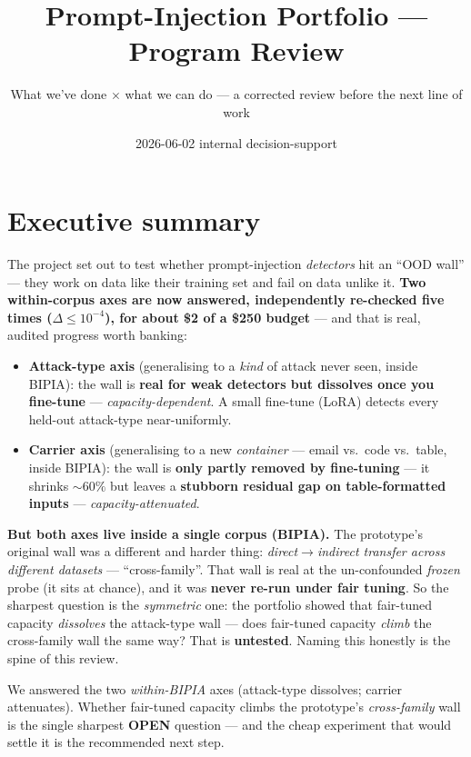 \documentclass[11pt,parskip=half-]{scrartcl}
\title{Prompt-Injection Portfolio --- Program Review}
\subtitle{\normalsize\mdseries\color{accent}What we've done {\(\times\)} what we can do --- a corrected review before the next line of work}
\date{2026-06-02 \quad\textbar\quad internal decision-support}
\author{}
\newcommand{\arr}{\ensuremath{\rightarrow}}
\begin{document}
\maketitle
\thispagestyle{empty}

\section*{Executive summary}

The project set out to test whether prompt-injection \emph{detectors} hit an ``OOD wall'' --- they
work on data like their training set and fail on data unlike it. \textbf{Two within-corpus axes are now
answered, independently re-checked five times ($\Delta \le 10^{-4}$), for about \$2 of a \$250 budget}
--- and that is real, audited progress worth banking:

\begin{itemize}
  \item \textbf{Attack-type axis} (generalising to a \emph{kind} of attack never seen, inside BIPIA):
    the wall is \textbf{real for weak detectors but dissolves once you fine-tune} ---
    \emph{capacity-dependent}. A small fine-tune (LoRA) detects every held-out attack-type
    near-uniformly.
  \item \textbf{Carrier axis} (generalising to a new \emph{container} --- email vs.\ code vs.\ table,
    inside BIPIA): the wall is \textbf{only partly removed by fine-tuning} --- it shrinks
    ${\sim}60\%$ but leaves a \textbf{stubborn residual gap on table-formatted inputs} ---
    \emph{capacity-attenuated}.
\end{itemize}

\textbf{But both axes live inside a single corpus (BIPIA).} The prototype's original wall was a
different and harder thing: \emph{direct\arr indirect transfer across different datasets} ---
``cross-family''. That wall is real at the un-confounded \emph{frozen} probe (it sits at chance), and it
was \textbf{never re-run under fair tuning}. So the sharpest question is the \emph{symmetric} one: the
portfolio showed that fair-tuned capacity \emph{dissolves} the attack-type wall --- does fair-tuned
capacity \emph{climb} the cross-family wall the same way? That is \textbf{untested}. Naming this honestly
is the spine of this review.

\begin{openbox}
We answered the two \emph{within-BIPIA} axes (attack-type dissolves; carrier attenuates). Whether
fair-tuned capacity climbs the prototype's \emph{cross-family} wall is the single sharpest \textbf{OPEN}
question --- and the cheap experiment that would settle it is the recommended next step.
\end{openbox}
\end{document}
